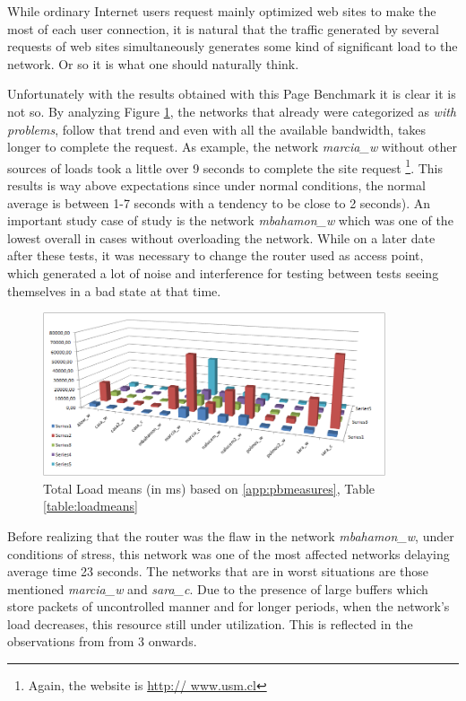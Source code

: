 While ordinary Internet users request mainly optimized  web sites to make the
most of each user connection, it is natural that the traffic generated by
several requests of web sites simultaneously generates some kind of significant
load to the network. Or so it is what one should naturally think.

Unfortunately with the results obtained with this Page Benchmark it is 
clear it is not so. By analyzing Figure \ref{fig:loadmeans}, the
networks that already were categorized as \textit{with problems}, follow that
trend and even with all the available bandwidth, takes longer to complete the
request. As example, the network \textit{marcia\_w} without other sources of
loads took a little over 9 seconds to complete the site request \footnote
{Again, the website is \url{http:// www.usm.cl}}. This results is way above
expectations since under normal conditions, the normal average is between 1-7
seconds with a tendency to be close to 2 seconds). An important study case of
study is the network \textit{mbahamon\_w} which was one of the lowest overall
in cases without overloading the network. While on a later date after these
tests, it was necessary to change the router used as access point, which
generated a lot of noise and interference for testing between tests seeing
themselves in a bad state at that time.

\begin{figure}[ht]
\centering
    \includegraphics[width=0.9\textwidth]{img/measures_page}
\caption[Page Benchmark: Total Load Means]{ Total Load means (in ms) based on \ref{app:pbmeasures}, Table \ref{table:loadmeans}}
\label{fig:loadmeans}
\end{figure}%

Before realizing that the router was the flaw in the network
\textit{mbahamon\_w}, under conditions of stress, this network was one of the
most affected networks delaying average time 23 seconds. The networks that are
in worst situations are those mentioned \textit{marcia\_w} and
\textit{sara\_c}. Due to the presence of large buffers which store packets of
uncontrolled manner and for longer periods, when the network's load decreases,
this resource  still under utilization. This is reflected in the observations
from from 3 onwards.

